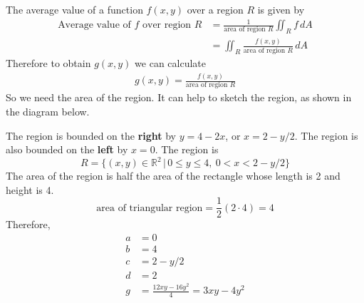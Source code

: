     \ifnum {} 
    {\color{DarkBlue} 
    The average value of a function $f(x,y)$ over a region $R$ is given by 
    \begin{align}
        \text{Average value of }f\text{ over region }R &= \frac{1}{\text{area of region }R}\iint_R f \, dA \\&= \iint_R \frac{f(x,y)}{\text{area of region }R} \, dA
    \end{align}
    Therefore to obtain $g(x,y)$ we can calculate
    \begin{align}
        g(x,y) = \frac{f(x,y)}{\text{area of region }R}
    \end{align}
    So we need the area of the region. It can help to sketch the region, as shown in the diagram below. 
       \begin{center}     
    \end{center}     
    The region is bounded on the \textbf{right} by $y=4-2x$, or $x=2-y/2$. The region is also bounded on the \textbf{left} by $x=0$. The region is 
    $$R = \{(x,y) \in \mathbb R^2 \, | \, 0\le y \le 4, \ 0 < x < 2-y/2\}$$
    The area of the region is half the area of the rectangle whose length is 2 and height is 4. 
    $$\text{area of triangular region} = \frac12 ( 2 \cdot 4) = 4$$    
    Therefore, 
    \begin{align}
        a & = 0 \\
        b &= 4 \\
        c &= 2-y/2 \\
        d &= 2 \\
        g &= \frac{12xy-16y^2}{4} = 3xy - 4y^2
    \end{align}
    }
   \else

